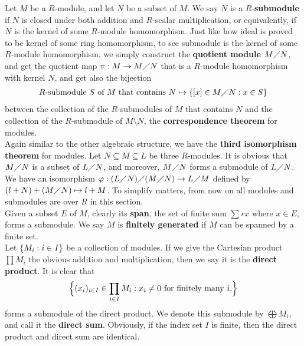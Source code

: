 \documentclass{report}
\begin{document}
Let $M$ be a  $R$-module, and let $N$ be a subset of  $M$. We say $N$ is a $R$-\textbf{submodule} if $N$ is closed under both addition and $R$-scalar multiplication, or equivalently, if $N$ is the kernel of some  $R$-module homomorphism. Just like how ideal is proved to be kernel of some ring homomorphism, to see submodule is the kernel of some $R$-module homomorphism, we simply construct the \textbf{quotient module} $M\diagup N$, and get the quotient map $\pi :M\rightarrow M\diagup N$ that is a $R$-module homomorphism with kernel $N$, and get also the bijection
\begin{align*}
R\text{-submodule $S$ of  $M$ that contains  $N$}\mapsto \{ [x]\in M \diagup N: x \in S \}
\end{align*}
 between the collection of the $R$-submodules of $M$ that contains  $N$ and the collection of the $R$-submodule of  $M\setminus N$, the  \textbf{correspondence theorem} for modules.\\


Again similar to the other algebraic structure, we have the \textbf{third isomorphism theorem} for modules. Let $N \subseteq M \subseteq L$ be three $R$-modules. It is obvious that $M\diagup N$ is a subset of $L\diagup N$, and moreover, $M\diagup  N$ forms a submodule of  $L\diagup N$. We have an isomorphism $\pfi:(L\quotient N)\quotient (M\quotient N)\to L\quotient M$ defined by $(l+N)+ (M\diagup N)\mapsto l+M$. To simplify matters, from now on all modules and submodules are over $R$ in this section. \\

Given a subset $E$ of  $M$, clearly its \textbf{span}, the set of finite sum $\sum rx$ where $x \in E$, forms a submodule. We say  $M$ is \textbf{finitely generated} if $M$ can be spanned by a finite set.\\




Let $\{ M_i:i \in I \}$ be a collection of modules. If we give the Cartesian product $\prod M_i$ the obvious addition and multiplication, then we say it is the \textbf{direct product}. It is clear that 
\begin{align*}
\Big\{ (x_i)_{i \in I} \in \prod_{i \in I}M_i:x_i \neq 0\text{ for finitely many }i. \Big\}
\end{align*}
forms a submodule of the direct product. We denote this submodule by $\bigoplus M_i$, and call it the  \textbf{direct sum}.  Obviously, if the index set $I$ is finite, then the direct product and direct sum are identical.  \\
\end{document}
